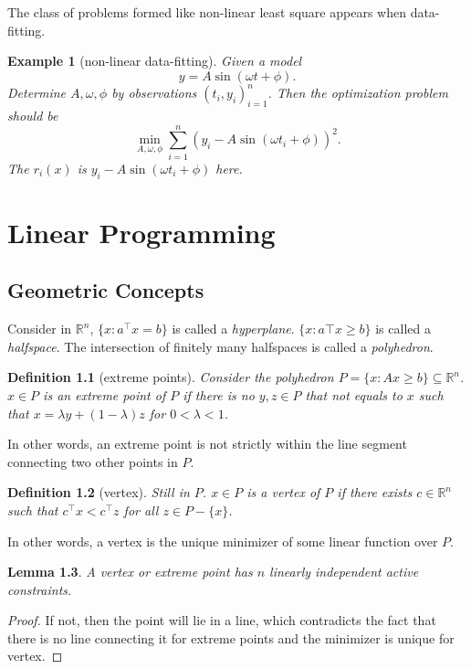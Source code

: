 \documentclass[12pt,a4paper]{report}
\numberwithin{equation}{section}
\theoremstyle{mystyle}
\newtheorem{definition}{Definition}[section]
\newtheorem{lemma}[definition]{Lemma}
\newtheorem{example}[definition]{Example}
\newcommand{\R}{\mathbb{R}}
\newcommand{\T}{\top}
\begin{document}
	The class of problems formed like non-linear least square appears when data-fitting.
	\begin{example}[non-linear data-fitting]
		Given a model 
		$$
		y=A\sin(\omega t+\phi).
		$$
		Determine $A,\omega,\phi$ by observations $(t_i,y_i)_{i=1}^n$. Then the optimization problem should be
		$$
		\min_{A,\omega,\phi}\sum_{i=1}^n (y_i-A\sin(\omega t_i+\phi))^2.
		$$
		The $r_i(x)$ is $y_i-A\sin(\omega t_i+\phi)$ here.
	\end{example}
	
	
	
	\chapter{Linear Programming}
	\section{Geometric Concepts}
	Consider in $\R^n$, $\{x:a^\T x=b\}$ is called a \emph{hyperplane}. $\{x:a\T x\geq b\}$ is called a \emph{halfspace}. The intersection of finitely many halfspaces is called a \emph{polyhedron}.
	
	\begin{definition}[extreme points]
		Consider the polyhedron $P=\{x:Ax\geq b\}\subseteq \R^n$. $x\in P$ is an \emph{extreme point} of $P$ if there is no $y,z\in P$ that not equals to $x$ such that $x=\lambda y+(1-\lambda )z$ for $0<\lambda <1$.
	\end{definition}
	 In other words, an extreme point is not strictly within the line segment connecting two other points in $P$.
	 
	 \begin{definition}[vertex]
	 	Still in $P$. $x\in P$ is a \emph{vertex} of $P$ if there exists $c\in \R^n$ such that $c^\T x<c^\T z$ for all $z\in P-\{x\}$. 
	 \end{definition}
	In other words, a vertex is the unique minimizer of some linear function over $P$.
	
	\begin{lemma}\label{lem:n constraint}
		A vertex or extreme point has $n$ linearly independent active constraints.
	\end{lemma}
	\begin{proof}
		If not, then the point will lie in a line, which contradicts the fact that there is no line connecting it for extreme points and the minimizer is unique for vertex.
	\end{proof}
	
\end{document}

